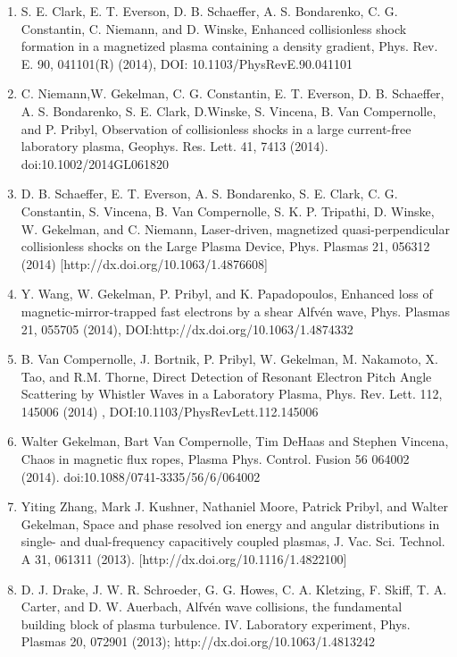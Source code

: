 \documentclass[11pt]{article}
\begin{document}
\begin{enumerate}
\item   S. E. Clark, E. T. Everson, D. B. Schaeffer, A. S. Bondarenko, C. G. Constantin, C. Niemann, and D. Winske, Enhanced collisionless shock formation in a magnetized plasma containing a density gradient, Phys. Rev. E. 90, 041101(R) (2014), DOI: 10.1103/PhysRevE.90.041101

\item    C. Niemann,W. Gekelman, C. G. Constantin, E. T. Everson, D. B. Schaeffer, A. S. Bondarenko, S. E. Clark, D.Winske, S. Vincena, B. Van Compernolle, and P. Pribyl, Observation of collisionless shocks in a large current-free laboratory plasma, Geophys. Res. Lett.  41, 7413 (2014). doi:10.1002/2014GL061820

\item   D. B. Schaeffer, E. T. Everson, A. S. Bondarenko, S. E. Clark, C. G. Constantin, S. Vincena, B. Van Compernolle, S. K. P. Tripathi, D. Winske, W. Gekelman, and C. Niemann, Laser-driven, magnetized quasi-perpendicular collisionless shocks on the Large Plasma Device, Phys. Plasmas 21, 056312 (2014) [http://dx.doi.org/10.1063/1.4876608]

\item  Y. Wang, W. Gekelman, P. Pribyl, and K. Papadopoulos, Enhanced loss of magnetic-mirror-trapped fast electrons by a shear Alfv\'{e}n wave, Phys. Plasmas  21, 055705 (2014), DOI:http://dx.doi.org/10.1063/1.4874332

\item   B. Van Compernolle, J. Bortnik, P. Pribyl, W. Gekelman, M. Nakamoto, X. Tao, and R.M. Thorne, Direct Detection of Resonant Electron Pitch Angle Scattering by Whistler Waves in a Laboratory Plasma, Phys. Rev. Lett. 112, 145006 (2014) , DOI:10.1103/PhysRevLett.112.145006

\item  Walter Gekelman, Bart Van Compernolle, Tim DeHaas and Stephen Vincena, Chaos in magnetic flux ropes, Plasma Phys. Control. Fusion 56  064002 (2014). doi:10.1088/0741-3335/56/6/064002

\item   Yiting Zhang, Mark J. Kushner, Nathaniel Moore, Patrick Pribyl, and Walter Gekelman, Space and phase resolved ion energy and angular distributions in single- and dual-frequency capacitively coupled plasmas, J. Vac. Sci. Technol. A 31, 061311 (2013). [http://dx.doi.org/10.1116/1.4822100]

\item  D. J. Drake, J. W. R. Schroeder, G. G. Howes, C. A. Kletzing, F. Skiff, T. A. Carter, and D. W. Auerbach, Alfv\'{e}n wave collisions, the fundamental building block of plasma turbulence. IV. Laboratory experiment, Phys. Plasmas 20, 072901 (2013); http://dx.doi.org/10.1063/1.4813242


\end{enumerate}
\end{document}
